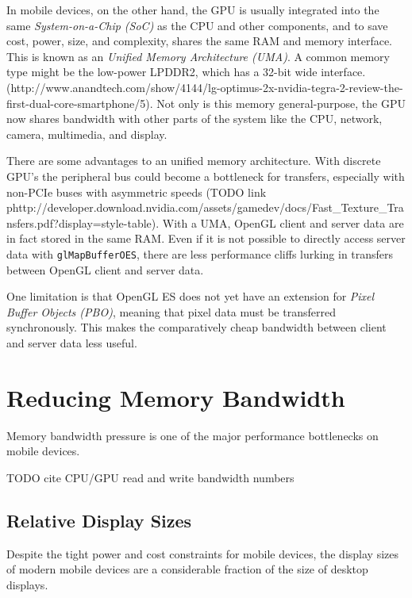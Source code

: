 In mobile devices, on the other hand, the GPU is usually integrated into the same \textit{System-on-a-Chip (SoC)} as the CPU and other components, and to save cost, power, size, and complexity, shares the same RAM and memory interface.  This is known as an \textit{Unified Memory Architecture (UMA)}.  A common memory type might be the low-power LPDDR2, which has a 32-bit wide interface. (http://www.anandtech.com/show/4144/lg-optimus-2x-nvidia-tegra-2-review-the-first-dual-core-smartphone/5).  Not only is this memory general-purpose, the GPU now shares bandwidth with other parts of the system like the CPU, network, camera, multimedia, and display.   

There are some advantages to an unified memory architecture.  With discrete GPU's the peripheral bus could become a bottleneck for transfers, especially with non-PCIe buses with asymmetric speeds (TODO link phttp://developer.download.nvidia.com/assets/gamedev/docs/Fast_Texture_Transfers.pdf?display=style-table).  With a UMA, OpenGL client and server data are in fact stored in the same RAM.  Even if it is not possible to directly access server data with \texttt{glMapBufferOES}, there are less performance cliffs lurking in transfers between OpenGL client and server data.

One limitation is that OpenGL ES does not yet have an extension for \textit{Pixel Buffer Objects (PBO)}, meaning that pixel data must be transferred synchronously.  This makes the comparatively cheap bandwidth between client and server data less useful.

\section{Reducing Memory Bandwidth}\label{Jon-McCaffrey:differences-in-memory-architecture}

Memory bandwidth pressure is one of the major performance bottlenecks on mobile devices.

TODO cite CPU/GPU read and write bandwidth numbers

\subsection{Relative Display Sizes}\label{Jon-McCaffrey:differences-in-memory-architecture}

Despite the tight power and cost constraints for mobile devices, the display sizes of modern mobile devices are a considerable fraction of the size of desktop displays.  

